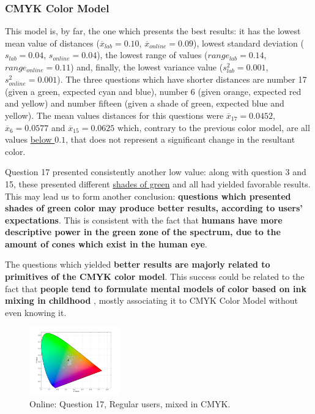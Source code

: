 \subsubsection{CMYK Color Model}
%
This model is, by far, the one which presents the best results: it has the lowest mean value of
distances ($\overline{x}_{lab} = 0.10$, $\overline{x}_{online} = 0.09$), lowest standard deviation
($s_{lab} = 0.04$, $s_{online} = 0.04$), the lowest range of values ($range_{lab} = 0.14$,
$range_{online} = 0.11$) and, finally, the lowest variance value ($s^2_{lab} = 0.001$, $s^2_{online}
= 0.001$). The three questions which have shorter distances are number 17 (given a green, expected
cyan and blue), number 6 (given orange, expected red and yellow) and number fifteen (given a shade
of green, expected blue and yellow). The mean values distances for this questions were $\overline{x}_{17}
= 0.0452$, $\overline{x}_{6} = 0.0577$ and $\overline{x}_{15} = 0.0625$ which, contrary to the
previous color model, are all values \ul{below $0.1$}, that does not represent a significant change
in the resultant color. \par
%
Question 17 presented consistently another low value: along with question 3 and 15, these presented
different \ul{shades of green} and all had yielded favorable results. This may lead us to form another
conclusion: \textbf{questions which presented shades of green color may produce better results, according
to users' expectations}. This is consistent with the fact that \textbf{humans have more descriptive power
in the green zone of the spectrum, due to the amount of cones which exist in the human eye}. \par
%
The questions which yielded \textbf{better results are majorly related to primitives of the CMYK color
model}. This success could be related to the fact that \textbf{people tend to formulate mental models of
color based on ink mixing in childhood} \cite{Gossett2004}, mostly associating it to CMYK Color Model
without even knowing it. \par
%
\begin{figure}[!htbp]
  \centering
  \includegraphics[width=0.35\textwidth]{images/17_online_CMYKresponses.png}
  \caption{Online: Question 17, Regular users, mixed in CMYK.}
  \label{fig:onlinecmykregular_17}
\end{figure}

